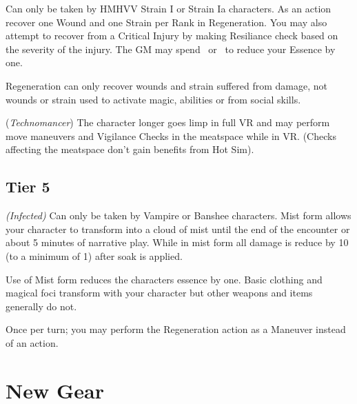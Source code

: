\documentclass{book}
\begin{document}
\begin{multicols}{2}
 \label{regenerationtalet} Can only be taken by HMHVV Strain I or Strain Ia characters. As an action recover one Wound and one Strain per Rank in Regeneration. You may also attempt to recover from a Critical Injury by making Resiliance check based on the severity of the injury. The GM may spend \Threat \Threat \Threat\ or \Despair\ to reduce your Essence by one.

Regeneration can only recover wounds and strain suffered from damage, not wounds or strain used to activate magic, abilities or from social skills.

 (\textit{Technomancer}) The character longer goes limp in full VR and may perform move maneuvers and Vigilance Checks in the meatspace while in VR. (Checks affecting the meatspace don't gain benefits from Hot Sim). 

\section{Tier 5}
 \textit{(Infected)} Can only be taken by Vampire or Banshee characters. Mist form allows your character to transform into a cloud of mist until the end of the encounter or about 5 minutes of narrative play. While in mist form all damage is reduce by 10 (to a minimum of 1) after soak is applied. 

Use of Mist form reduces the characters essence by one. Basic clothing and magical foci transform with your character but other weapons and items generally do not.

  
Once per turn; you may perform the Regeneration action as a Maneuver instead of an action.

\end{multicols}

\chapter{New Gear}
\end{document}
